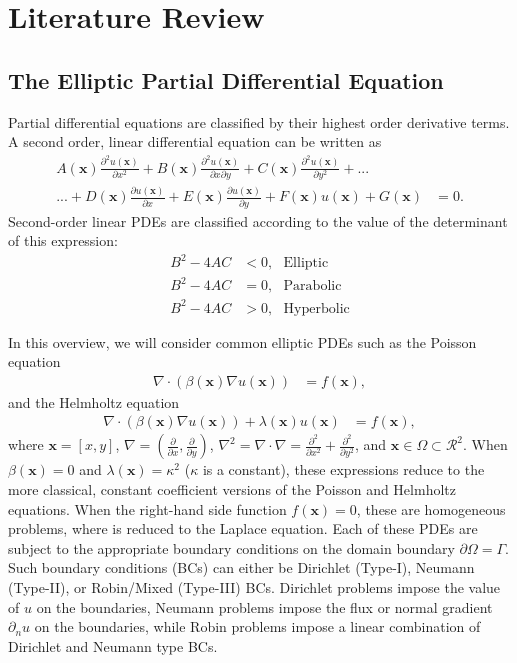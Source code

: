 \section{Literature Review}
\label{sec:lit-review}

\subsection{The Elliptic Partial Differential Equation}

Partial differential equations are classified by their highest order derivative terms. A second order, linear differential equation can be written as
\begin{align*}
    A(\textbf{x}) \frac{\partial^2 u(\textbf{x})}{\partial x^2} + B(\textbf{x}) \frac{\partial^2 u(\textbf{x})}{\partial x \partial y} + C(\textbf{x}) \frac{\partial^2 u(\textbf{x})}{\partial y^2} + ... \\
    ... + D(\textbf{x}) \frac{\partial u(\textbf{x})}{\partial x} + E(\textbf{x}) \frac{\partial u(\textbf{x})}{\partial y} + F(\textbf{x}) u(\textbf{x}) + G(\textbf{x}) &= 0.
\end{align*}
Second-order linear PDEs are classified according to the value of the determinant of this expression:
\begin{align*}
    B^2 - 4AC &< 0,\ \ \ \text{Elliptic} \\
    B^2 - 4AC &= 0,\ \ \ \text{Parabolic} \\
    B^2 - 4AC &> 0,\ \ \ \text{Hyperbolic}
\end{align*}

In this overview, we will consider common elliptic PDEs such as the Poisson equation
\begin{align}
    \nabla \cdot \left( \beta(\textbf{x}) \nabla u(\textbf{x}) \right) &= f(\textbf{x}),
    \label{eq:variable_poisson}
\end{align}
and the Helmholtz equation
\begin{align}
    \nabla \cdot \left( \beta(\textbf{x}) \nabla u(\textbf{x}) \right) + \lambda(\textbf{x}) u(\textbf{x}) &= f(\textbf{x}),
    \label{eq:variable_helmholtz}
\end{align}
where $\textbf{x} = [x, y]$, $\nabla = (\frac{\partial}{\partial x}, \frac{\partial}{\partial y})$, $\nabla^2 = \nabla \cdot \nabla = \frac{\partial^2}{\partial x^2} + \frac{\partial^2}{\partial y^2}$, and $\textbf{x} \in \Omega \subset \mathcal{R}^2$. When $\beta(\textbf{x}) = 0$ and $\lambda(\textbf{x}) = \kappa^2$ ($\kappa$ is a constant), these expressions reduce to the more classical, constant coefficient versions of the Poisson and Helmholtz equations. When the right-hand side function $f(\textbf{x}) = 0$, these are homogeneous problems, where  is reduced to the Laplace equation. Each of these PDEs are subject to the appropriate boundary conditions on the domain boundary $\partial \Omega = \Gamma$. Such boundary conditions (BCs) can either be Dirichlet (Type-I), Neumann (Type-II), or Robin/Mixed (Type-III) BCs. Dirichlet problems impose the value of $u$ on the boundaries, Neumann problems impose the flux or normal gradient $\partial_n u$ on the boundaries, while Robin problems impose a linear combination of Dirichlet and Neumann type BCs.

